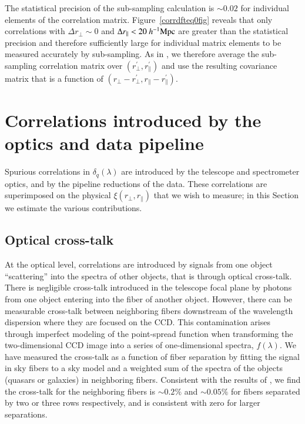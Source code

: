 \documentclass{aa}
\newcommand{\dqlam}{\delta_q(\lambda)}
\newcommand{\hMpc}{h^{-1}{\rm Mpc}}
\newcommand{\Lya}{Ly$\alpha$~}
\newcommand{\rperp}{r_\perp}
\newcommand{\rpar}{r_\parallel}
\begin{document}
The statistical precision of the sub-sampling calculation is
$\sim0.02$ for
individual elements of the correlation matrix.
Figure~\ref{corrdfteq0fig} reveals that only correlations with 
$\Delta\rperp\sim0$ and $\Delta\rpar<20~\hMpc$ are greater than
the statistical precision and therefore sufficiently large 
for individual matrix elements to be
measured accurately by sub-sampling.
As in \citet{2015A&A...574A..59D},
we therefore  average the sub-sampling correlation matrix
over $(\rperp^\prime,\rpar^\prime)$ and use the resulting
covariance matrix  that is a function
of $(\rperp-\rperp^\prime,\rpar-\rpar^\prime)$.

\section{Correlations introduced by the optics and data pipeline}
\label{instcorrsec}

Spurious correlations in $\dqlam$  are introduced
by the telescope and spectrometer optics, 
and by the pipeline reductions of the data. 
These correlations are superimposed on the physical $\xi(\rperp,\rpar)$
that we wish to measure;  
in this Section we estimate the various contributions.

\subsection{Optical cross-talk}

At the optical level, correlations are introduced by signals
from one object ``scattering'' into the spectra of other objects, that is
through optical cross-talk.
There is negligible cross-talk introduced in the telescope focal plane
by photons from one object entering into the fiber of another object. 
However, there can be measurable cross-talk between
neighboring fibers downstream of the wavelength dispersion 
where they are focused on the CCD.
This contamination arises
through imperfect modeling of the point-spread function
when transforming the  two-dimensional CCD image into a series 
of one-dimensional spectra, $f(\lambda)$.
We have measured the cross-talk as a function of fiber separation
by fitting the signal in sky fibers to a sky model and a weighted
sum of the spectra of the objects (quasars or galaxies) in neighboring
fibers.
Consistent with the results of \citet{2016MNRAS.457.3541C}, we find
the cross-talk for the neighboring fibers
is $\sim0.2\%$ and
$\sim0.05\%$ for fibers separated by two or three rows respectively,
and is consistent with zero for larger separations.
\end{document}
